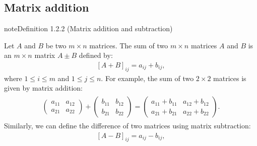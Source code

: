 \documentclass[letterpaper,10pt,english]{jupyterBook}
\begin{document}
\subsection{Matrix addition}
\label{\detokenize{_pages/1.1_Matrix_operations:matrix-addition}}\label{\detokenize{_pages/1.1_Matrix_operations:index-1}}\label{\detokenize{_pages/1.1_Matrix_operations:matrix-addition-section}}\label{_pages/1.1_Matrix_operations:matrix-addition-definition}
\begin{sphinxadmonition}{note}{Definition 1.2.2 (Matrix addition and subtraction)}



\sphinxAtStartPar
Let \(A\) and \(B\) be two \(m \times n\) matrices. The sum of two \(m \times n\) matrices \(A\) and \(B\) is an \(m \times n\) matrix \(A \pm B\) defined by:
\begin{equation}\label{equation:_pages/1.1_Matrix_operations:matrix-addition-equation}
\begin{split} [A + B]_{ij} = a_{ij} + b_{ij}, \end{split}
\end{equation}
\sphinxAtStartPar
where \(1 \leq i \leq m\) and \(1 \leq j \leq n\). For example, the sum of two \(2 \times 2\) matrices is given by matrix addition:
\begin{equation*}
\begin{split} \begin{align*}
    \begin{pmatrix}
        a_{11} & a_{12} \\
        a_{21} & a_{22}
    \end{pmatrix} +
    \begin{pmatrix}
        b_{11} & b_{12} \\
        b_{21} & b_{22}
    \end{pmatrix} =
    \begin{pmatrix}
        a_{11} + b_{11} & a_{12} + b_{12} \\
        a_{21} + b_{21} & a_{22} + b_{22}
    \end{pmatrix}.
\end{align*}  \end{split}
\end{equation*}
\sphinxAtStartPar
Similarly, we can define the difference of two matrices using matrix subtraction:
\begin{equation}\label{equation:_pages/1.1_Matrix_operations:matrix-subtraction-equation}
\begin{split} [A - B]_{ij} = a_{ij} - b_{ij}, \end{split}

\end{equation}
\end{sphinxadmonition}
\end{document}
